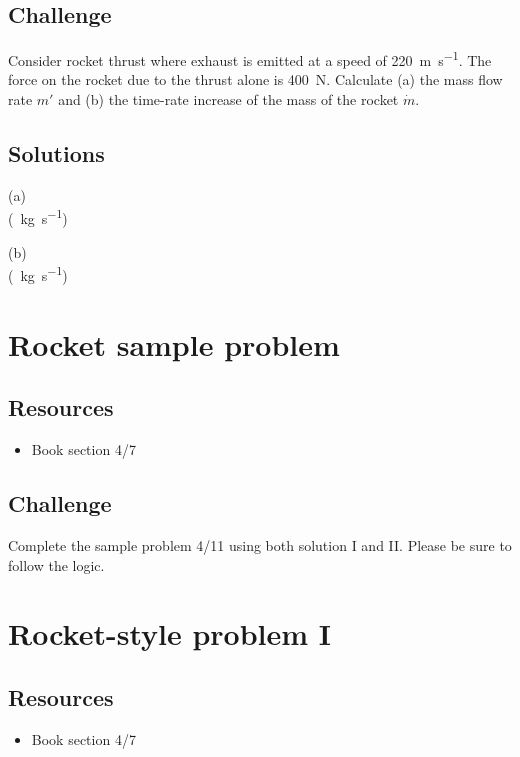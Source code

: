 \subsection*{Challenge}
Consider rocket thrust where exhaust is emitted at a speed of \SI{220}{\meter\per\second}. The force on the rocket due to the thrust alone is \SI{400}{\newton}. Calculate (a) the mass flow rate $m'$ and (b) the time-rate increase of the mass of the rocket $\dot{m}$.

\subsection*{Solutions}
(a)\\
 (\SI{}{\kg\per\second})

(b)\\
 (\SI{}{\kg\per\second})




\newpage
\section{Rocket sample problem}

\subsection*{Resources}
\begin{itemize}
    \item Book section 4/7
\end{itemize}

\subsection*{Challenge}
Complete the sample problem 4/11 using both solution I and II. Please be sure to follow the logic.




\newpage
\section{Rocket-style problem I}

\subsection*{Resources}
\begin{itemize}
    \item Book section 4/7
\end{itemize}

